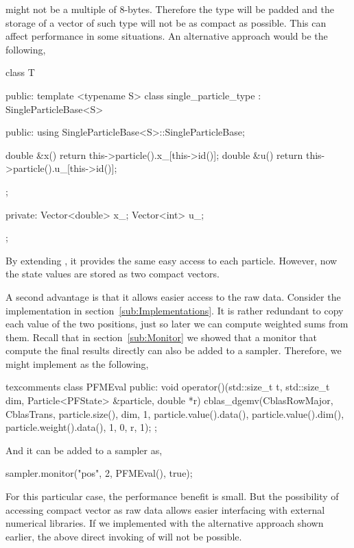 might not be a multiple of 8-bytes. Therefore the type will be padded and the
storage of a vector of such type will not be as compact as possible. This can
affect performance in some situations. An alternative approach would be the
following,
\begin{cppcode}
  class T
  {
      public:
      template <typename S>
      class single_particle_type : SingleParticleBase<S>
      {
          public:
          using SingleParticleBase<S>::SingleParticleBase;

          double &x() { return this->particle().x_[this->id()]; }
          double &u() { return this->particle().u_[this->id()]; }
      };

      private:
      Vector<double> x_;
      Vector<int> u_;
  };
\end{cppcode}
By extending , it provides the same easy access to
each particle. However, now the state values are stored as two compact vectors.

A second advantage is that it allows easier access to the raw data. Consider
the implementation  in section~\ref{sub:Implementations}.
It is rather redundant to copy each value of the two positions, just so later
we can compute weighted sums from them. Recall that in
section~\ref{sub:Monitor} we showed that a monitor that compute the final
results directly can also be added to a sampler. Therefore, we might
implement  as the following,
\begin{cppcode*}{texcomments}
  class PFMEval
  {
      public:
      void operator()(std::size_t t, std::size_t dim,
          Particle<PFState> &particle, double *r)
      {
          cblas_dgemv(CblasRowMajor, CblasTrans, particle.size(), dim, 1,
              particle.value().data(), particle.value().dim(),
              particle.weight().data(), 1, 0, r, 1);
      }
  };
\end{cppcode*}
And it can be added to a sampler as,
\begin{cppcode}
  sampler.monitor("pos", 2, PFMEval(), true);
\end{cppcode}
For this particular case, the performance benefit is small. But the possibility
of accessing compact vector as raw data allows easier interfacing with external
numerical libraries. If we implemented  with the alternative
approach shown earlier, the above direct invoking of 
will not be possible.
